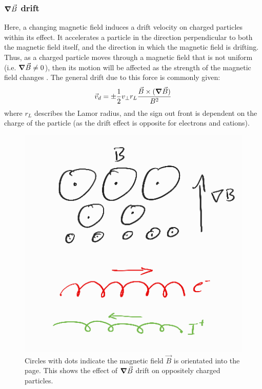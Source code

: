 \subsubsection{$\grad \vec{B}$ drift}
Here, a changing magnetic field induces a drift velocity on charged particles within its effect. It accelerates a particle 
in the direction perpendicular to both the magnetic field itself, and the direction in which the magnetic field is drifting.
Thus, as a charged particle moves through a magnetic field that is not uniform (i.e. $\grad \vec{B} \ne 0$), then 
its motion will be affected as the strength of the magnetic field changes \cite{howard-plasma-physics}. The general 
drift due to this force is commonly given:
\begin{equation*}
    \vec{v}_d = \pm\frac{1}{2} v_{\perp} r_L \frac{\vec{B} \times (\grad \vec{B})}{B^2}
\end{equation*}
where $r_L$ describes the Lamor radius, and the sign out front is dependent on the charge of the particle (as the 
drift effect is opposite for electrons and cations).

\begin{figure}[h!]
    \centering
    \includegraphics[scale=2.1]{imgs/c2/gradb-drift.png}
    \caption{Circles with dots indicate the magnetic field $\vec{B}$ is orientated into the page. This shows the effect of 
    $\grad \vec{B}$ drift on oppositely charged particles.}
\end{figure}\newpage

